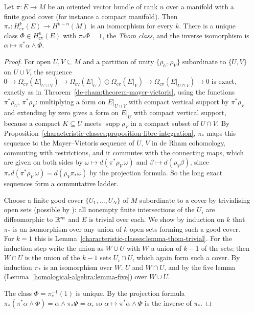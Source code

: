 \begin{theorem}\label{characteristic-classes:theorem-thom-de-rham}
Let $\pi \colon E \to M$ be an oriented vector bundle of rank $n$ over a manifold with a finite good cover (for instance a compact manifold). Then $\pi_* \colon H^k_{\mathrm{cv}}(E) \to H^{k-n}(M)$ is an isomorphism for every $k$. There is a
unique class $\Phi \in H^n_{\mathrm{cv}}(E)$ with $\pi_*\Phi = 1$, the \emph{Thom class}, and the inverse isomorphism is $\alpha \mapsto \pi^*\alpha \wedge \Phi$.
\end{theorem}

\begin{proof}
For open $U, V \subseteq M$ and a partition of unity $\{\rho_U, \rho_V\}$ subordinate to $\{U, V\}$ on $U \cup V$, the sequence
$0 \to \Omega_{\mathrm{cv}}(E|_{U \cup V}) \to \Omega_{\mathrm{cv}}(E|_U) \oplus \Omega_{\mathrm{cv}}(E|_V) \to \Omega_{\mathrm{cv}}(E|_{U \cap V}) \to 0$ is exact, exactly as in Theorem~\ref{de-rham:theorem-mayer-vietoris}, using the functions
$\pi^*\rho_U$, $\pi^*\rho_V$: multiplying a form on $E|_{U \cap V}$ with compact vertical support by $\pi^*\rho_V$ and extending by zero gives a form on $E|_U$ with compact vertical support, because a compact $K \subseteq U$ meets
$\operatorname{supp}\rho_V$ in a compact subset of $U \cap V$. By Proposition~\ref{characteristic-classes:proposition-fibre-integration}, $\pi_*$ maps this sequence to the Mayer--Vietoris sequence of $U$, $V$ in de Rham
cohomology, commuting with restrictions, and it commutes with the connecting maps, which are given on both sides by $\omega \mapsto d(\pi^*\rho_V\,\omega)$ and $\beta \mapsto d(\rho_V\beta)$, since
$\pi_*d(\pi^*\rho_V\,\omega) = d(\rho_V\pi_*\omega)$ by the projection formula. So the long exact sequences form a commutative ladder.

Choose a finite good cover $\{U_1, \ldots, U_N\}$ of $M$ subordinate to a cover by trivialising open sets (possible by \cite[Chapter I, Section 5]{bott-tu}): all nonempty finite intersections of the $U_i$ are diffeomorphic to $\mathbb{R}^m$ and
$E$ is trivial over each. We show by induction on $k$ that $\pi_*$ is an isomorphism over any union of $k$ open sets forming such a good cover. For $k = 1$ this is Lemma~\ref{characteristic-classes:lemma-thom-trivial}. For the
induction step write the union as $W \cup U$ with $W$ a union of $k - 1$ of the sets; then $W \cap U$ is the union of the $k - 1$ sets $U_i \cap U$, which again form such a cover. By induction $\pi_*$ is an isomorphism over $W$, $U$ and
$W \cap U$, and by the five lemma (Lemma~\ref{homological-algebra:lemma-five}) over $W \cup U$.

The class $\Phi = \pi_*^{-1}(1)$ is unique. By the projection formula $\pi_*(\pi^*\alpha \wedge \Phi) = \alpha \wedge \pi_*\Phi = \alpha$, so $\alpha \mapsto \pi^*\alpha \wedge \Phi$ is the inverse of $\pi_*$.
\end{proof}


